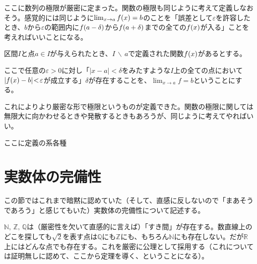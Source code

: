 ここに数列の極限が厳密に定まった。関数の極限も同じように考えて定義しなおそう。感覚的には同じように$\lim_{x\to{}a}f\pare{x}=b$のことを「誤差として$\varepsilon$を許容したとき、$b$から$\varepsilon$の範囲内に$f\pare{a-\delta}$から$f\pare{a+\delta}$までの全ての$f\pare{x}$が入る」ことを考えればいいことになる。

\begin{defi}
    区間$I$と点$a\!\in\!I$が与えられたとき、$I\,\backslash\,a$で定義された関数$f\pare{x}$があるとする。

    ここで任意の$\varepsilon\!>\!0$に対し「$|x\!-\!a|\!<\!\delta$をみたすような$I$上の全ての点において$|f\pare{x}-b|\!<\!\varepsilon$が成立する」$\delta$が存在することを、$\lim_{x\to{}a}f=b$ということにする。
\end{defi}

これによりより厳密な形で極限というものが定義できた。関数の極限に関しては無限大に向かわせるときや発散するときもあろうが、同じように考えてやればいい。

\begin{defi}
    ここに定義の系各種
\end{defi}




\clearpage
\section{実数体の完備性}
この節ではこれまで暗黙に認めていた（そして、直感に反しないので「まあそうであろう」と感じてもいた）実数体の完備性について記述する。

$\mathbb{N},\,\mathbb{Z},\,\mathbb{Q}$は（厳密性を欠いて直感的に言えば）「すき間」が存在する。数直線上のどこを探しても$\sqrt{2}$を表す点は$\mathbb{Q}$にも$\mathbb{Z}$にも、もちろん$\mathbb{N}$にも存在しない。だが$\mathbb{R}$上にはどんな点でも存在する。これを厳密に公理として採用する（これについては証明無しに認めて、ここから定理を導く、ということになる）。